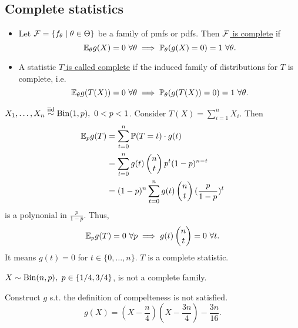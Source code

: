 \subsection{Complete statistics}
\begin{mydef}\textbf{ }
	\begin{itemize}
		\item Let $\mathcal{F} = \{ f_\theta\mid \theta\in \Theta \}$ be a family of pmfs or pdfs. Then \underline{$\mathcal{F}$ is complete} if 
		$$\mathbb{E}_\theta g(X) = 0 \ \forall \theta \implies \mathbb{P}_\theta (g(X) = 0 ) = 1 \ \forall \theta.$$
		
		\item A statistic \underline{$T$ is called complete} if the induced family of distributions for $T$ is complete, i.e.
		$$\EE_\theta g(T(X)) = 0 \ \forall \theta \implies \PP_\theta(g(T(X)) = 0) =1 \ \forall \theta.$$
	\end{itemize}
\end{mydef}

\begin{exap}
	$X_1, \dots, X_n \SimIID \Bin(1,p),\ 0<p<1$. Consider $T(X) = \sum^n_{i=1} X_i$. Then
	\begin{align*}
		\mathbb{E}_p g(T) &= \sum^n_{t=0} \mathbb{P}(T = t) \cdot g(t) \\
		&=\sum^n_{t=0} g(t) \begin{pmatrix}
		n \\
		t
		\end{pmatrix} p^t (1-p)^{n-t} \\ 
		&=(1-p)^n \sum^n_{t=0} g(t) \begin{pmatrix}
		n \\
		t
		\end{pmatrix} (\frac{p}{1-p})^t
	\end{align*}
	is a polynonial in $\frac{p}{1-p}$. Thus,
	$$\mathbb{E}_p g(T) = 0 \ \forall p \implies g(t) \begin{pmatrix}
	n \\
	t
	\end{pmatrix} = 0 \ \forall t.$$
	It means $g(t)=0$ for $t \in \{ 0,\dots, n \}$. $T$ is a complete statistic.	
\end{exap}

\begin{exap}
	$X \sim \mathrm{Bin}(n,p), \ p\in \{ 1/4, 3/4 \}$, is not a complete family.
	
	Construct $g$ s.t. the definition of compelteness is not satisfied.
	$$g(X) = (X-\frac{n}{4})(X-\frac{3n}{4}) - \frac{3n}{16}.$$
\end{exap}

